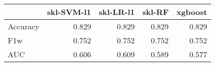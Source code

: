 \begin{tabular}{lrrrr}
\toprule
{} &  skl-SVM-l1 &  skl-LR-l1 &  skl-RF &  xgboost \\
\midrule
Accuracy &       0.829 &      0.829 &   0.829 &    0.829 \\
F1w      &       0.752 &      0.752 &   0.752 &    0.752 \\
AUC      &       0.606 &      0.609 &   0.589 &    0.577 \\
\bottomrule
\end{tabular}
